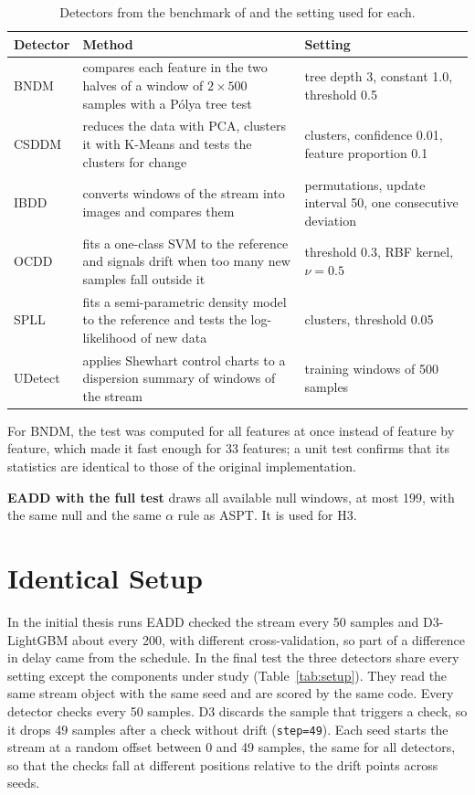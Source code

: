 \begin{table}[!htbp]
\centering
\caption[Detectors from the benchmark of Lukats et al.]{Detectors from the benchmark of \citet{Lukats2024} and the setting used for each.}
\label{tab:lukats}
\small
\begin{tabular}{>{\raggedright\arraybackslash}p{2.0cm}>{\raggedright\arraybackslash}p{6.4cm}>{\raggedright\arraybackslash}p{4.8cm}}
\toprule
Detector & Method & Setting \\
\midrule
BNDM \citep{BNDM2020} & compares each feature in the two halves of a window of $2 \times 500$ samples with a P\'{o}lya tree test & tree depth 3, constant 1.0, threshold 0.5 \\
\addlinespace
CSDDM \citep{CSDDM2021} & reduces the data with PCA, clusters it with K-Means and tests the clusters for change & 2 clusters, confidence 0.01, feature proportion 0.1 \\
\addlinespace
IBDD \citep{IBDD2021} & converts windows of the stream into images and compares them & 20 permutations, update interval 50, one consecutive deviation \\
\addlinespace
OCDD \citep{OCDD2021} & fits a one-class SVM to the reference and signals drift when too many new samples fall outside it & threshold 0.3, RBF kernel, $\nu = 0.5$ \\
\addlinespace
SPLL \citep{SPLL2013} & fits a semi-parametric density model to the reference and tests the log-likelihood of new data & 2 clusters, threshold 0.05 \\
\addlinespace
UDetect \citep{Bashir2017} & applies Shewhart control charts to a dispersion summary of windows of the stream & 25 training windows of 500 samples \\
\bottomrule
\end{tabular}
\end{table}

For BNDM, the test was computed for all features at once instead of feature by feature, which made it fast enough for 33 features; a unit test confirms that its statistics are identical to those of the original implementation.

\textbf{EADD with the full test} draws all available null windows, at most 199, with the same null and the same $\alpha$ rule as ASPT. It is used for H3.

\section{Identical Setup}
\label{sec:setup}
In the initial thesis runs EADD checked the stream every 50 samples and D3-LightGBM about every 200, with different cross-validation, so part of a difference in delay came from the schedule. In the final test the three detectors share every setting except the components under study (Table~\ref{tab:setup}). They read the same stream object with the same seed and are scored by the same code. Every detector checks every 50 samples. D3 discards the sample that triggers a check, so it drops 49 samples after a check without drift (\texttt{step=49}). Each seed starts the stream at a random offset between 0 and 49 samples, the same for all detectors, so that the checks fall at different positions relative to the drift points across seeds.

